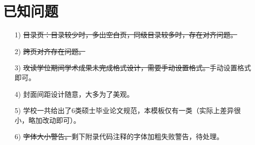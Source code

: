 \section{已知问题}
\begin{itemize}
	\item[1)] \sout{目录页：目录较少时，多出空白页，同级目录较多时，存在对齐问题。}
	\item[2)] \sout{跨页对齐存在问题。}
	\item[3)] \sout{攻读学位期间学术成果未完成格式设计，需要手动设置格式。}\quad 手动设置格式即可。
	\item[4)] 封面间距设计随意，大多为了美观。
	\item[5)] 学校一共给出了6类硕士毕业论文规范，本模板仅有一类（实际上差异很小，略加改动即可）。
	\item[6)] \sout{字体大小警告。}\quad 剩下附录代码注释的字体加粗失败警告，待处理。
\end{itemize}